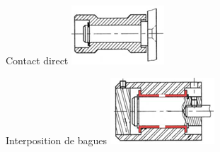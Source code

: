 \documentclass[11pt,oneside]{article}
\begin{document}
\noindent\begin{minipage}[t]{.23\linewidth}
\begin{center}
Contact direct
\includegraphics[width=.9\textwidth]{png/fig06}
\end{center}
\end{minipage}\hfill
\begin{minipage}[t]{.23\linewidth}
\begin{center}
Interposition de bagues
\includegraphics[width=.9\textwidth]{png/fig07}
\end{center}
\end{minipage}\hfill
\end{document}
